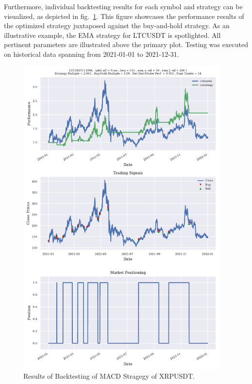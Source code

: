 Furthermore, individual backtesting results for each symbol and strategy can be visualized, as depicted in fig.~\ref{fig:backtest_results}.
This figure showcases the performance results of the optimized strategy juxtaposed against the buy-and-hold strategy.
As an illustrative example, the EMA strategy for LTCUSDT is spotlighted. All pertinent parameters are illustrated above the primary plot.
Testing was executed on historical data spanning from 2021-01-01 to 2021-12-31.

\begin{figure} [H]
\centering
\includegraphics[page=1, trim=0mm 0mm 0 0mm, width=0.95\textwidth, clip]{./pdf/backtesting_results.pdf}
\caption{Results of Backtesting of MACD Stragegy of XRPUSDT.}
\label{fig:backtest_results}
\end{figure}

